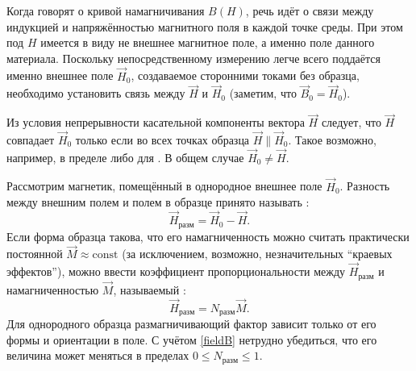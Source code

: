 %


\label{sec:measure-HB}


Когда говорят о кривой намагничивания $B(H)$,
речь идёт о  связи между
индукцией и напряжённостью магнитного поля в каждой точке среды.
При этом под $H$ имеется в виду не внешнее магнитное поле,
а именно поле  данного материала. Поскольку непосредственному
измерению легче всего поддаётся именно внешнее поле $\vec{H}_{0}$,
создаваемое сторонними токами без образца, необходимо установить связь
между $\vec{H}$ и $\vec{H}_0$ (заметим, что $\vec{B}_0=\vec{H}_0$).

Из условия непрерывности касательной компоненты вектора $\vec{H}$ следует,
что $\vec{H}$ совпадает $\vec{H}_{0}$ только если во всех точках образца
$\vec{H} \parallel \vec{H}_{0}$.
Такое возможно, например, в пределе  либо
для .
В общем случае $\vec{H}_0 \ne \vec{H}$.

Рассмотрим магнетик, помещённый в однородное внешнее поле $\vec{H}_0$.
Разность между внешним полем и полем в образце принято называть
:
\begin{equation}
\vec{H}_{разм} = \vec{H}_0 - \vec{H}.
\end{equation}
Если форма образца такова, что его намагниченность можно считать
практически постоянной $\vec{M}\approx\mathrm{const}$ (за исключением,
возможно, незначительных ``краевых эффектов''), можно ввести
коэффициент пропорциональности между $\vec{H}_{разм}$ и намагниченностью $\vec{M}$,
называемый :
\begin{equation}
\vec{H}_{разм}  = N_{разм}\vec{M}.
\end{equation}
Для однородного образца размагничивающий фактор зависит
только от его формы и ориентации в поле.
С учётом \eqref{fieldB} нетрудно убедиться, что его величина может меняться в пределах $0\le N_{разм} \le 1$.

